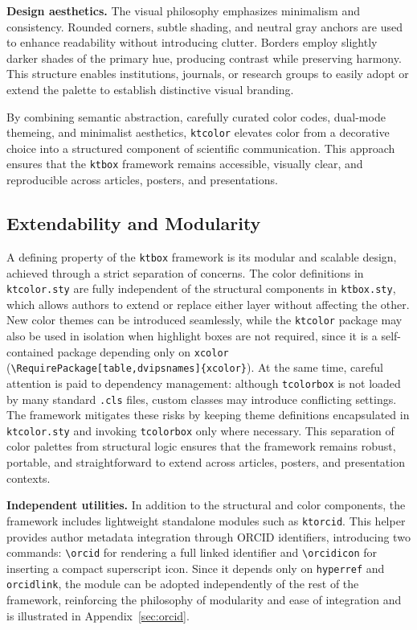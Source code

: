 \documentclass[12pt,onecolumn]{article}
\begin{document}
  \textbf{Design aesthetics.} The visual philosophy emphasizes minimalism and consistency. Rounded corners, subtle shading, and neutral gray anchors are used to enhance readability without introducing clutter. Borders employ slightly darker shades of the primary hue, producing contrast while preserving harmony. This structure enables institutions, journals, or research groups to easily adopt or extend the palette to establish distinctive visual branding.

  By combining semantic abstraction, carefully curated color codes, dual-mode themeing, and minimalist aesthetics, \texttt{ktcolor} elevates color from a decorative choice into a structured component of scientific communication. This approach ensures that the \texttt{ktbox} framework remains accessible, visually clear, and reproducible across articles, posters, and presentations.

\subsection{Extendability and Modularity}
\label{sec:extendability-and-modularity}
  A defining property of the \texttt{ktbox} framework is its modular and scalable design, achieved through a strict separation of concerns. The color definitions in \texttt{ktcolor.sty} are fully independent of the structural components in \texttt{ktbox.sty}, which allows authors to extend or replace either layer without affecting the other. New color themes can be introduced seamlessly, while the \texttt{ktcolor} package may also be used in isolation when highlight boxes are not required, since it is a self-contained package depending only on \texttt{xcolor} (\verb|\RequirePackage[table,dvipsnames]{xcolor}|). At the same time, careful attention is paid to dependency management: although \texttt{tcolorbox} is not loaded by many standard \texttt{.cls} files, custom classes may introduce conflicting settings. The framework mitigates these risks by keeping theme definitions encapsulated in \texttt{ktcolor.sty} and invoking \texttt{tcolorbox} only where necessary. This separation of color palettes from structural logic ensures that the framework remains robust, portable, and straightforward to extend across articles, posters, and presentation contexts.

  \textbf{Independent utilities.} In addition to the structural and color components, the framework includes lightweight standalone modules such as \texttt{ktorcid}. This helper provides author metadata integration through ORCID identifiers, introducing two commands: \verb|\orcid| for rendering a full linked identifier and \verb|\orcidicon| for inserting a compact superscript icon. Since it depends only on \texttt{hyperref} and \texttt{orcidlink}, the module can be adopted independently of the rest of the framework, reinforcing the philosophy of modularity and ease of integration and is illustrated in Appendix~\ref{sec:orcid}.
\end{document}
